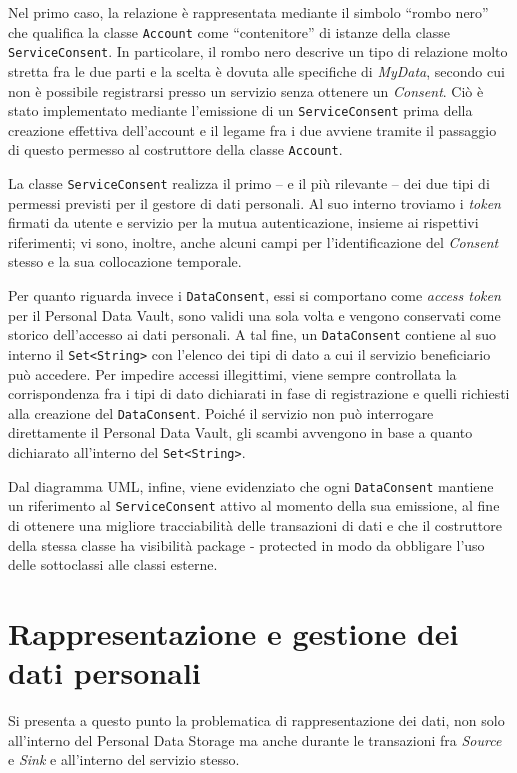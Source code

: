 Nel primo caso, la relazione \`e rappresentata mediante il simbolo “rombo nero” che qualifica la classe \texttt{Account} come “contenitore” di istanze della classe \texttt{ServiceConsent}. In particolare, il rombo nero descrive un tipo di relazione molto stretta fra le due parti e la scelta \`e dovuta alle specifiche di \textit{MyData}, secondo cui non \`e possibile registrarsi presso un servizio senza ottenere un \textit{Consent}. Ci\`o \`e stato implementato mediante l’emissione di un \texttt{ServiceConsent} prima della creazione effettiva dell’account e il legame fra i due avviene tramite il passaggio di questo permesso al costruttore della classe \texttt{Account}.

La classe \texttt{ServiceConsent} realizza il primo – e il pi\`u rilevante – dei due tipi di permessi previsti per il gestore di dati personali. Al suo interno troviamo i \textit{token} firmati da utente e servizio per la mutua autenticazione, insieme ai rispettivi riferimenti; vi sono, inoltre, anche alcuni campi per l’identificazione del \textit{Consent} stesso e la sua collocazione temporale.

Per quanto riguarda invece i \texttt{DataConsent}, essi si comportano come \textit{access token} per il Personal Data Vault, sono validi una sola volta e vengono conservati come storico dell’accesso ai dati personali. A tal fine, un \texttt{DataConsent} contiene al suo interno il \texttt{Set<String>} con l’elenco dei tipi di dato a cui il servizio beneficiario pu\`o accedere. Per impedire accessi illegittimi, viene sempre controllata la corrispondenza fra i tipi di dato dichiarati in fase di registrazione e quelli richiesti alla creazione del \texttt{DataConsent}. Poich\'e il servizio non pu\`o interrogare direttamente il Personal Data Vault, gli scambi avvengono in base a quanto dichiarato all’interno del \texttt{Set<String>}.

Dal diagramma UML, infine, viene evidenziato che ogni \texttt{DataConsent} mantiene un riferimento al \texttt{ServiceConsent} attivo al momento della sua emissione, al fine di ottenere una migliore tracciabilit\`a delle transazioni di dati e che il costruttore della stessa classe ha visibilit\`a package - protected in modo da obbligare l’uso delle sottoclassi alle classi esterne.

\section{Rappresentazione e gestione dei dati personali}
\label{sec:P-datinonnotiapriori}
Si presenta a questo punto la problematica di rappresentazione dei dati, non solo all’interno del Personal Data Storage ma anche durante le transazioni fra \textit{Source} e \textit{Sink} e all’interno del servizio stesso.

